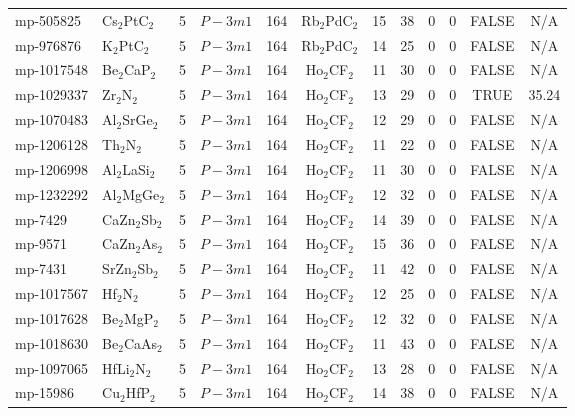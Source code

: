 {\begin{longtable}{llcccccccccc}
    mp-505825 & Cs$_{2}$PtC$_{2}$ & 5     & $P-3m1$ & 164   & Rb$_{2}$PdC$_{2}$ & 15    & 38    & 0     & 0     & FALSE & N/A \\
    mp-976876 & K$_{2}$PtC$_{2}$ & 5     & $P-3m1$ & 164   & Rb$_{2}$PdC$_{2}$ & 14    & 25    & 0     & 0     & FALSE & N/A \\
    mp-1017548 & Be$_{2}$CaP$_{2}$ & 5     & $P-3m1$ & 164   & Ho$_{2}$CF$_{2}$ & 11    & 30    & 0     & 0     & FALSE & N/A \\
    mp-1029337 & Zr$_{2}$N$_{2}$ & 5     & $P-3m1$ & 164   & Ho$_{2}$CF$_{2}$ & 13    & 29    & 0     & 0     & TRUE  & 35.24  \\
    mp-1070483 & Al$_{2}$SrGe$_{2}$ & 5     & $P-3m1$ & 164   & Ho$_{2}$CF$_{2}$ & 12    & 29    & 0     & 0     & FALSE & N/A \\
    mp-1206128 & Th$_{2}$N$_{2}$ & 5     & $P-3m1$ & 164   & Ho$_{2}$CF$_{2}$ & 11    & 22    & 0     & 0     & FALSE & N/A \\
    mp-1206998 & Al$_{2}$LaSi$_{2}$ & 5     & $P-3m1$ & 164   & Ho$_{2}$CF$_{2}$ & 11    & 30    & 0     & 0     & FALSE & N/A \\
    mp-1232292 & Al$_{2}$MgGe$_{2}$ & 5     & $P-3m1$ & 164   & Ho$_{2}$CF$_{2}$ & 12    & 32    & 0     & 0     & FALSE & N/A \\
    mp-7429 & CaZn$_{2}$Sb$_{2}$ & 5     & $P-3m1$ & 164   & Ho$_{2}$CF$_{2}$ & 14    & 39    & 0     & 0     & FALSE & N/A \\
    mp-9571 & CaZn$_{2}$As$_{2}$ & 5     & $P-3m1$ & 164   & Ho$_{2}$CF$_{2}$ & 15    & 36    & 0     & 0     & FALSE & N/A \\
    mp-7431 & SrZn$_{2}$Sb$_{2}$ & 5     & $P-3m1$ & 164   & Ho$_{2}$CF$_{2}$ & 11    & 42    & 0     & 0     & FALSE & N/A \\
    mp-1017567 & Hf$_{2}$N$_{2}$ & 5     & $P-3m1$ & 164   & Ho$_{2}$CF$_{2}$ & 12    & 25    & 0     & 0     & FALSE & N/A \\
    mp-1017628 & Be$_{2}$MgP$_{2}$ & 5     & $P-3m1$ & 164   & Ho$_{2}$CF$_{2}$ & 12    & 32    & 0     & 0     & FALSE & N/A \\
    mp-1018630 & Be$_{2}$CaAs$_{2}$ & 5     & $P-3m1$ & 164   & Ho$_{2}$CF$_{2}$ & 11    & 43    & 0     & 0     & FALSE & N/A \\
    mp-1097065 & HfLi$_{2}$N$_{2}$ & 5     & $P-3m1$ & 164   & Ho$_{2}$CF$_{2}$ & 13    & 28    & 0     & 0     & FALSE & N/A \\
    mp-15986 & Cu$_{2}$HfP$_{2}$ & 5     & $P-3m1$ & 164   & Ho$_{2}$CF$_{2}$ & 14    & 38    & 0     & 0     & FALSE & N/A \\

\end{longtable}}
